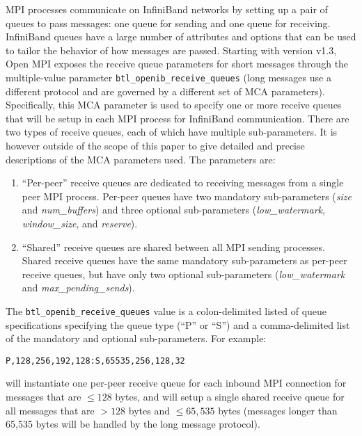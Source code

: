 MPI processes communicate on InfiniBand networks by setting up a pair
of queues to pass messages: one queue for sending and one queue for
receiving.  InfiniBand queues have a large number of attributes and
options that can be used to tailor the behavior of how messages are
passed.  Starting with version v1.3, Open MPI exposes the receive
queue parameters for short messages through the multiple-value
parameter {\tt btl\_\-openib\_\-receive\_\-queues} (long messages use
a different protocol and are governed by a different set of MCA
parameters).  Specifically, this MCA parameter is used to specify one
or more receive queues that will be setup in each MPI process for
InfiniBand communication.  There are two types of receive queues, each
of which have multiple sub-parameters. It is however outside of the scope of this paper to give detailed and precise descriptions of the MCA parameters used. The parameters are:

\begin{enumerate}
\item ``Per-peer'' receive queues are dedicated to receiving messages
  from a single peer MPI process. Per-peer queues have two mandatory
  sub-parameters ({\em size} and {\em num\_\-buffers}) and three
  optional sub-parameters ({\em low\_\-watermark}, {\em
    window\_\-size}, and {\em reserve}).

\item ``Shared'' receive queues are shared between all MPI sending
  processes. Shared receive queues have the same mandatory
  sub-parameters as per-peer receive queues, but have only two
  optional sub-parameters ({\em low\_\-watermark} and {\em
    max\_\-pending\_\-sends}).
\end{enumerate}

The {\tt btl\_\-openib\_\-receive\_\-queues} value is a
colon-delimited listed of queue specifications specifying the queue
type (``P'' or ``S'') and a comma-delimited list of the mandatory and
optional sub-parameters.  For example:

\vspace{5pt}
\centerline{\tt P,128,256,192,128:S,65535,256,128,32}
\vspace{5pt}

will instantiate one per-peer receive queue for each inbound MPI
connection for messages that are $\le128$ bytes, and will setup a
single shared receive queue for all messages that are $>128$ bytes and
$\le65,535$ bytes (messages longer than 65,535 bytes will be handled
by the long message protocol).

